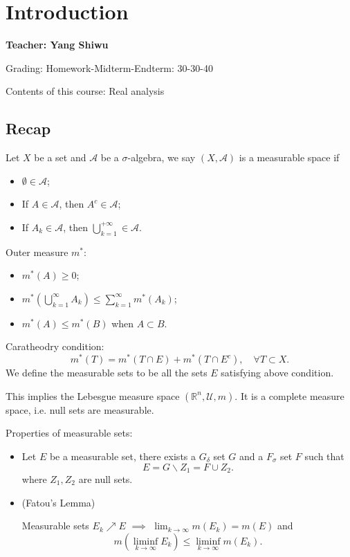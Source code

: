 \section{Introduction}
\label{sec:Introduction}
\begin{center}
	\sffamily\large\bfseries Teacher: Yang Shiwu
\end{center}

Grading: Homework-Midterm-Endterm: 30-30-40

Contents of this course: Real analysis

\subsection{Recap}
\label{sub:Recap}
\begin{definition}
	Let $X$ be a set and $\mathcal{A}$ be a $\sigma$-algebra,
	we say  $(X, \mathcal{A})$ is a measurable space if
	\begin{itemize}
		\item $\emptyset \in \mathcal{A}$;
		\item If $A\in \mathcal{A}$, then $A^c\in \mathcal{A}$;
		\item If  $A_k\in \mathcal{A}$, then $\bigcup_{k=1}^{+\infty } \in \mathcal{A}$.
	\end{itemize}
\end{definition}

Outer measure $m^*$:
\begin{itemize}
	\item $m^*(A)\ge 0$;
	\item  $m^*(\bigcup_{k=1}^{\infty }A_k)\le \sum_{k=1}^{\infty} m^*(A_k)$;
	\item $m^*(A)\le m^*(B)$ when $A\subset B$.
\end{itemize}

Caratheodry condition:
\[
m^*(T) = m^*(T \cap E) + m^*(T \cap E^c),\quad \forall T \subset X
.\]
We define the measurable sets to be all the sets $E$ satisfying above condition.

This implies the Lebesgue measure space $(\mathbb{R}^n, \mathscr{U}, m)$.
It is a complete measure space, i.e. null sets are measurable.

\begin{proposition}
	\label{mfatou}
	
	Properties of measurable sets:
	\begin{itemize}
		\item Let $E$ be a measurable set, there exists 
	a $G_{\delta}$ set $G$ and a $F_{\sigma}$ set $F$
	such that
	 \[
		 E = G\backslash Z_1 = F \cup Z_2
	.\]
	where $Z_1,Z_2$ are null sets.
		\item (Fatou's Lemma)
	
	 Measurable sets $E_k\nearrow E$  $\implies$  $ \lim_{k \to \infty}m(E_k) = m(E)$
	 and
	 \[
		 m\left(\liminf_{k\to \infty}E_k\right)\le \liminf_{k\to \infty}m(E_k)
	.\]

	\end{itemize}
\end{proposition}

